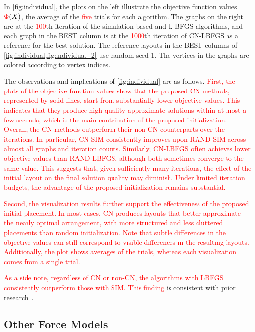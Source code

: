\documentclass[11pt]{article}
\newcommand{\red}[1]{\textcolor{red}{#1}}
\begin{document}
In \cref{fig:individual}, the plots on the left illustrate the objective function values $\red{\Phi}(X)$, the average of the \red{five} trials for each algorithm.
The graphs on the right are at the \red{100}th iteration of the simulation-based and L-BFGS algorithms, and each graph in the \textsf{BEST} column is at the \red{1000}th iteration of \textsf{CN-LBFGS} as a reference for the best solution.
The reference layouts in the \textsf{BEST} columns of \cref{fig:individual,fig:individual_2} use random seed 1.
The vertices in the graphs are colored according to vertex indices.

The observations and implications of \cref{fig:individual} are as follows.
\red{First, the plots of the objective function values show that the proposed \textsf{CN} methods, represented by solid lines, start from substantially lower objective values.
  This indicates that they produce high-quality approximate solutions within at most a few seconds, which is the main contribution of the proposed initialization.
  Overall, the \textsf{CN} methods outperform their non-\textsf{CN} counterparts over the iterations.
  In particular, \textsf{CN-SIM} consistently improves upon \textsf{RAND-SIM} across almost all graphs and iteration counts.
  Similarly, \textsf{CN-LBFGS} often achieves lower objective values than \textsf{RAND-LBFGS}, although both sometimes converge to the same value.
  This suggests that, given sufficiently many iterations, the effect of the initial layout on the final solution quality may diminish.
  Under limited iteration budgets, the advantage of the proposed initialization remains substantial.
}

\red{Second, the visualization results further support the effectiveness of the proposed initial placement.
  In most cases, \textsf{CN} produces layouts that better approximate the nearly optimal arrangement, with more structured and less cluttered placements than random initialization.
  Note that subtle differences in the objective values can still correspond to visible differences in the resulting layouts.
  Additionally, the plot shows averages of the trials, whereas each visualization comes from a single trial.
}

\red{As a side note, regardless of \textsf{CN} or non-\textsf{CN}, the algorithms with \textsf{LBFGS} consistently outperform those with \textsf{SIM}.
  This finding} is consistent with prior research~\citep{6183577}.

\subsection{Other Force Models}
\end{document}
